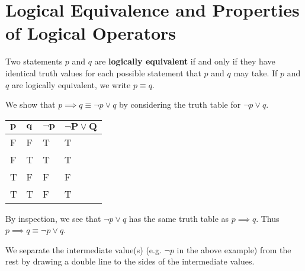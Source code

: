 \section{Logical Equivalence and Properties of Logical Operators}
\begin{definition}
    Two statements $p$ and $q$ are \textbf{logically equivalent} if and only if they have identical truth values for each possible statement that $p$ and $q$ may take. If $p$ and $q$ are logically equivalent, we write $p \equiv q$.
\end{definition}
\begin{example}
    We show that $p \implies q \equiv \lnot p \lor q$ by considering the truth table for $\lnot p \lor q$.
    \begin{table}[h]
        \centering
        \begin{tabular}{|l|l||l||l|}
            \hline
            $\boldsymbol{p}$ & $\boldsymbol{q}$ & $\boldsymbol{\lnot p}$ & $\boldsymbol{\lnot P \lor Q}$ \\ \hline
            F   & F   & T         & T                  \\ \hline
            F   & T   & T         & T                  \\ \hline
            T   & F   & F         & F                  \\ \hline
            T   & T   & F         & T                  \\ \hline
        \end{tabular}
    \end{table}

    By inspection, we see that $\lnot p \lor q$ has the same truth table as $p \implies q$. Thus $p \implies q \equiv \lnot p \lor q$.
\end{example}
\begin{remark}
    We separate the intermediate value(s) (e.g. $\lnot p$ in the above example) from the rest by drawing a double line to the sides of the intermediate values.
\end{remark}

\newpage


